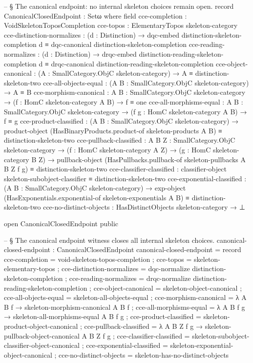 \documentclass[11pt]{article}
\begin{document}
\begin{code}
-- § The canonical endpoint: no internal skeleton choices remain open.
record CanonicalClosedEndpoint : Setω where
  field
    cce-completion              : VoidSkeletonToposCompletion
    cce-topos                   : ElementaryTopos skeleton-category
    cce-distinction-normalizes  :
      (d : Distinction) →
      dqc-embed distinction-skeleton-completion d ≡
      dqc-canonical distinction-skeleton-completion
    cce-reading-normalizes      :
      (d : Distinction) →
      drqc-embed distinction-reading-skeleton-completion d ≡
      drqc-canonical distinction-reading-skeleton-completion
    cce-object-canonical        :
      (A : SmallCategory.ObjC skeleton-category) → A ≡ distinction-skeleton-two
    cce-all-objects-equal       :
      (A B : SmallCategory.ObjC skeleton-category) → A ≡ B
    cce-morphism-canonical      :
      {A B : SmallCategory.ObjC skeleton-category} →
      (f : HomC skeleton-category A B) → f ≡ one
    cce-all-morphisms-equal     :
      {A B : SmallCategory.ObjC skeleton-category} →
      (f g : HomC skeleton-category A B) → f ≡ g
    cce-product-classified      :
      (A B : SmallCategory.ObjC skeleton-category) →
      product-object (HasBinaryProducts.product-of skeleton-products A B) ≡
      distinction-skeleton-two
    cce-pullback-classified     :
      {A B Z : SmallCategory.ObjC skeleton-category} →
      (f : HomC skeleton-category A Z) →
      (g : HomC skeleton-category B Z) →
      pullback-object (HasPullbacks.pullback-of skeleton-pullbacks {A} {B} {Z} f g) ≡
      distinction-skeleton-two
    cce-classifier-classified   :
      classifier-object skeleton-subobject-classifier ≡ distinction-skeleton-two
    cce-exponential-classified  :
      (A B : SmallCategory.ObjC skeleton-category) →
      exp-object (HasExponentials.exponential-of skeleton-exponentials A B) ≡
      distinction-skeleton-two
    cce-no-distinct-objects     : HasDistinctObjects skeleton-category → ⊥

open CanonicalClosedEndpoint public

-- § The canonical endpoint witness closes all internal skeleton choices.
canonical-closed-endpoint : CanonicalClosedEndpoint
canonical-closed-endpoint = record
  { cce-completion             = void-skeleton-topos-completion
  ; cce-topos                  = skeleton-elementary-topos
  ; cce-distinction-normalizes = dqc-normalize distinction-skeleton-completion
  ; cce-reading-normalizes     = drqc-normalize distinction-reading-skeleton-completion
  ; cce-object-canonical       = skeleton-object-canonical
  ; cce-all-objects-equal      = skeleton-all-objects-equal
  ; cce-morphism-canonical     = λ {A} {B} f →
      skeleton-morphism-canonical {A} {B} f
  ; cce-all-morphisms-equal    = λ {A} {B} f g →
      skeleton-all-morphisms-equal {A} {B} f g
  ; cce-product-classified     = skeleton-product-object-canonical
  ; cce-pullback-classified    = λ {A} {B} {Z} f g →
      skeleton-pullback-object-canonical {A} {B} {Z} f g
  ; cce-classifier-classified  = skeleton-subobject-classifier-object-canonical
  ; cce-exponential-classified = skeleton-exponential-object-canonical
  ; cce-no-distinct-objects    = skeleton-has-no-distinct-objects
  }


\end{code}
\end{document}
